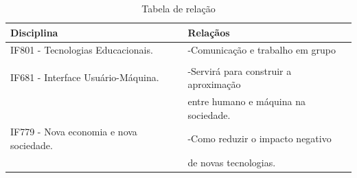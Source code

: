 \documentclass[10pt]{article}
\begin{document}
\begin{table}[h]
    \caption{Tabela de relação}
    \centering
    \begin{tabular}{| l | l |}
         \hline
         Disciplina & Relaçãos \\
        \hline
        IF801 - Tecnologias Educacionais. & -Comunicação  e trabalho em grupo\\& \\\hline
        IF681 - Interface Usuário-Máquina. & -Servirá para construir a aproximação \\&entre humano e máquina na sociedade. \\\hline
        IF779 - Nova economia e nova sociedade. & -Como reduzir o impacto negativo \\&de novas tecnologias.\\\hline
    \end{tabular}
    \label{tab:my_label}
\end{table}




\end{document}

